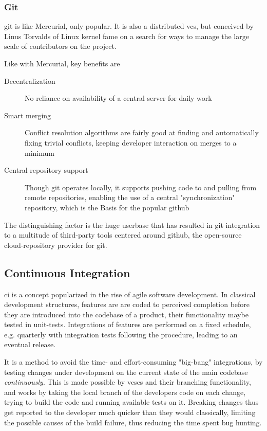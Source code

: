 \subsubsection{Git}
\gls{git} is like Mercurial, only popular. It is also a distributed \gls{vcs}, but conceived by Linus Torvalds of Linux kernel fame on a search for ways to manage the large scale of contributors on the project.

Like with Mercurial, key benefits are
\begin{description}
	\item[Decentralization] No reliance on availability of a central server for daily work
	\item[Smart merging] Conflict resolution algorithms are fairly good at finding and automatically fixing trivial conflicts, keeping developer interaction on merges to a minimum
	\item[Central repository support] Though git operates locally, it supports pushing code to and pulling from remote repositories, enabling the use of a central "synchronization" repository, which is the Basis for the popular \gls{github} 
\end{description}

The distinguishing factor is the huge userbase that has resulted in git integration to a multitude of third-party tools centered around github, the open-source \gls{cloud}-repository provider for git.

\subsection{Continuous Integration}
\gls{ci} is a concept popularized in the rise of agile software development. In classical development structures, features are are coded to perceived completion before they are introduced into the codebase of a product, their functionality maybe tested in unit-tests. Integrations of features are performed on a fixed schedule, e.g. quarterly with integration tests following the procedure, leading to an eventual release.

It is a method to avoid the time- and effort-consuming "big-bang" integrations, by testing changes under development on the current state of the main codebase \textit{continuously}. This is made possible by \gls{vcs}es and their branching functionality, and works by taking the local branch of the developers code on each change, trying to build the code and running available tests on it. Breaking changes thus get reported to the developer much quicker than they would classically, limiting the possible causes of the build failure, thus reducing the time spent bug hunting.

